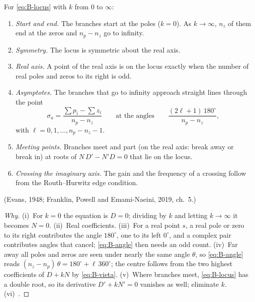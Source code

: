 \begin{theorem}
\label{thm:B-locus}
For \cref{eq:B-locus} with $k$ from $0$ to $\infty$:
\begin{enumerate}[label=(\roman*)]
  \item \emph{Start and end.} The branches start at the poles ($k = 0$). As $k \to \infty$, $n_z$ of them end at the zeros and $n_p - n_z$ go to infinity.
  \item \emph{Symmetry.} The locus is symmetric about the real axis.
  \item \emph{Real axis.} A point of the real axis is on the locus exactly when the number of real poles and zeros to its right is odd.
  \item \emph{Asymptotes.} The branches that go to infinity approach straight lines through the point
  \begin{equation*}
    \sigma_a = \frac{\sum p_i - \sum z_i}{n_p - n_z}
    \qquad\text{at the angles}\qquad \frac{(2\ell + 1)\,180^\circ}{n_p - n_z},
  \end{equation*}
  with $\ell = 0, 1, \dots, n_p - n_z - 1$.
  \item \emph{Meeting points.} Branches meet and part (on the real axis: break away or break in) at roots of $N\,D' - N'D = 0$ that lie on the locus.
  \item \emph{Crossing the imaginary axis.} The gain and the frequency of a crossing follow from the Routh–Hurwitz edge condition.
\end{enumerate}
(Evans, 1948; Franklin, Powell and Emami-Naeini, 2019, ch.~5.)
\end{theorem}
\begin{proof}[Why]
(i)~For $k = 0$ the equation is $D = 0$; dividing by $k$ and letting $k \to \infty$ it becomes $N = 0$. (ii)~Real coefficients. (iii)~For a real point $s$, a real pole or zero to its right contributes the angle $180^\circ$, one to its left $0^\circ$, and a complex pair contributes angles that cancel; \cref{eq:B-angle} then needs an odd count. (iv)~Far away all poles and zeros are seen under nearly the same angle $\theta$, so \cref{eq:B-angle} reads $(n_z - n_p)\,\theta = 180^\circ + \ell\,360^\circ$; the centre follows from the two highest coefficients of $D + kN$ by \cref{eq:B-vieta}. (v)~Where branches meet, \cref{eq:B-locus} has a double root, so its derivative $D' + kN' = 0$ vanishes as well; eliminate $k$. (vi)~.
\end{proof}

